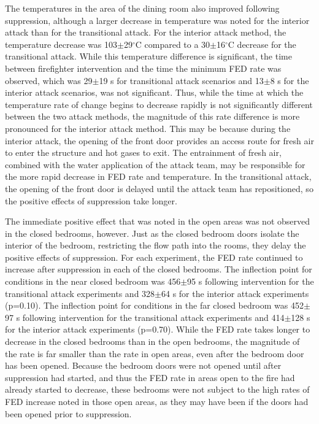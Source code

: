 \documentclass[12pt,oneside]{article}
\begin{document}
The temperatures in the area of the dining room also improved following suppression, although a larger decrease in temperature was noted for the interior attack than for the transitional attack. For the interior attack method, the temperature decrease was 103$\pm$29$^{\circ}$C compared to a 30$\pm$16$^{\circ}$C decrease for the transitional attack. While this temperature difference is significant, the time between firefighter intervention and the time the minimum FED rate was observed, which was 29$\pm$19 s for transitional attack scenarios and 13$\pm$8 s for the interior attack scenarios, was not significant. Thus, while the time at which the temperature rate of change begins to decrease rapidly is not significantly different between the two attack methods, the magnitude of this rate difference is more pronounced for the interior attack method. This may be because during the interior attack, the opening of the front door provides an access route for fresh air to enter the structure and hot gases to exit. The entrainment of fresh air, combined with the water application of the attack team, may be responsible for the more rapid decrease in FED rate and temperature. In the transitional attack, the opening of the front door is delayed until the attack team has repositioned, so the positive effects of suppression take longer.

The immediate positive effect that was noted in the open areas was not observed in the closed bedrooms, however. Just as the closed bedroom doors isolate the interior of the bedroom, restricting the flow path into the rooms, they delay the positive effects of suppression. For each experiment, the FED rate continued to increase after suppression in each of the closed bedrooms. The inflection point for conditions in the near closed bedroom was 456$\pm$95 s following intervention for the transitional attack experiments and 328$\pm$64 s for the interior attack experiments (p=0.10).  The inflection point for conditions in the far closed bedroom  was 452$\pm$97 s following intervention for the transitional attack experiments and 414$\pm$128 s for the interior attack experiments (p=0.70).  While the FED rate takes longer to decrease in the closed bedrooms than in the open bedrooms, the magnitude of the rate is far smaller than the rate in open areas, even after the bedroom door has been opened. Because the bedroom doors were not opened until after suppression had started, and thus the FED rate in areas open to the fire had already started to decrease, these bedrooms were not subject to the high rates of FED increase noted in those open areas, as they may have been if the doors had been opened prior to suppression. 
\end{document}
